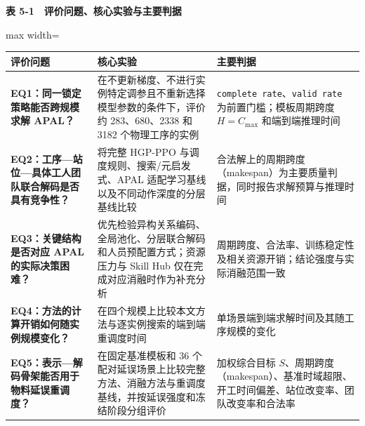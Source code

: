 \documentclass[journal,10pt]{IEEEtran}
\renewcommand{\arraystretch}{1.08}
\begin{document}
\begin{table}[!t]
\centering
\footnotesize
\textbf{表 5-1　评价问题、核心实验与主要判据}\par\smallskip
\setlength{\tabcolsep}{3pt}
\renewcommand{\arraystretch}{1.08}
\begin{adjustbox}{max width=\textwidth}
\begin{tabular}{@{}
  >{\raggedright\arraybackslash}p{}
  >{\raggedright\arraybackslash}p{}
  >{\raggedright\arraybackslash}p{}@{}}
\toprule
\begin{minipage}[b]{\linewidth}\raggedright
评价问题
\end{minipage} & \begin{minipage}[b]{\linewidth}\raggedright
核心实验
\end{minipage} & \begin{minipage}[b]{\linewidth}\raggedright
主要判据
\end{minipage} \\
\midrule
\textbf{EQ1：同一锁定策略能否跨规模求解 APAL？} & 在不更新梯度、不进行实例特定调参且不重新选择模型参数的条件下，评价约 283、680、2338 和 3182 个物理工序的实例 & \texttt{complete\ rate}、\texttt{valid\ rate} 为前置门槛；模板周期跨度 \(H=C_{\max}\) 和端到端推理时间 \\
\textbf{EQ2：工序---站位---具体工人团队联合解码是否具有竞争性？} & 将完整 HGP-PPO 与调度规则、搜索/元启发式、APAL 适配学习基线以及不同动作深度的分层基线比较 & 合法解上的周期跨度（makespan）为主要质量判据，同时报告求解预算与推理时间 \\
\textbf{EQ3：关键结构是否对应 APAL 的实际决策困难？} & 优先检验异构关系编码、全局池化、分层联合解码和人员预配置方式；资源压力与 Skill Hub 仅在完成对应消融时作为补充分析 & 周期跨度、合法率、训练稳定性及相关资源开销；结论强度与实际消融范围一致 \\
\textbf{EQ4：方法的计算开销如何随实例规模变化？} & 在四个规模上比较本文方法与逐实例搜索的端到端重调度时间 & 单场景端到端求解时间及其随工序规模的变化 \\
\textbf{EQ5：表示---解码骨架能否用于物料延误重调度？} & 在固定基准模板和 36 个配对延误场景上比较完整方法、消融方法与重调度基线，并按延误强度和冻结阶段分组评价 & 加权综合目标 \(S\)、周期跨度（makespan）、基准时域超限、开工时间偏差、站位改变率、团队改变率和合法率 \\
\bottomrule
\end{tabular}
\end{adjustbox}
\end{table}
\end{document}
